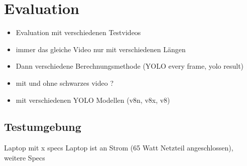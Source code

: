 \chapter{Evaluation}
\label{ch:Evaluation}

{
	\begin{itemize}
		\item Evaluation mit verschiedenen Testvideos
		\item immer das gleiche Video nur mit verschiedenen Längen
		\item Dann verschiedene Berechnungsmethode (YOLO every frame, yolo result)
		\item mit und ohne schwarzes video ?
		\item mit verschiedenen YOLO Modellen (v8n, v8x, v8)
	\end{itemize}

}
\section{Testumgebung}{
	Laptop mit x specs
	Laptop ist an Strom (65 Watt Netzteil angeschlossen), weitere Specs
}
